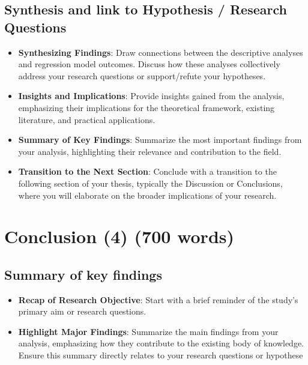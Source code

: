 \documentclass[
  12pt,
]{article}
\begin{document}
\subsection{Synthesis and link to Hypothesis / Research
Questions}\label{synthesis-and-link-to-hypothesis-research-questions}

\begin{itemize}
\item
  \textbf{Synthesizing Findings}: Draw connections between the
  descriptive analyses and regression model outcomes. Discuss how these
  analyses collectively address your research questions or
  support/refute your hypotheses.
\item
  \textbf{Insights and Implications}: Provide insights gained from the
  analysis, emphasizing their implications for the theoretical
  framework, existing literature, and practical applications.
\item
  \textbf{Summary of Key Findings}: Summarize the most important
  findings from your analysis, highlighting their relevance and
  contribution to the field.
\item
  \textbf{Transition to the Next Section}: Conclude with a transition to
  the following section of your thesis, typically the Discussion or
  Conclusions, where you will elaborate on the broader implications of
  your research.
\end{itemize}

\section{Conclusion (4) (700 words)}\label{conclusion-4-700-words}

\subsection{Summary of key findings}\label{summary-of-key-findings}

\begin{itemize}
\item
  \textbf{Recap of Research Objective}: Start with a brief reminder of
  the study's primary aim or research questions.
\item
  \textbf{Highlight Major Findings}: Summarize the main findings from
  your analysis, emphasizing how they contribute to the existing body of
  knowledge. Ensure this summary directly relates to your research
  questions or hypothese
\end{itemize}
\end{document}
